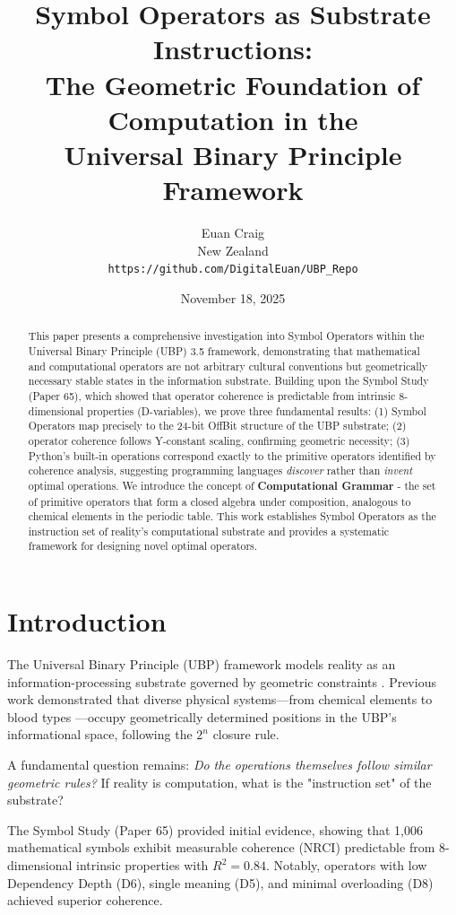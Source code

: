 \documentclass[12pt,a4paper]{article}
\title{\textbf{Symbol Operators as Substrate Instructions:\\
The Geometric Foundation of Computation in the\\
Universal Binary Principle Framework}}
\author{Euan Craig\\
New Zealand\\
\texttt{https://github.com/DigitalEuan/UBP\_Repo}}
\date{November 18, 2025}
\begin{document}
\maketitle

\begin{abstract}
This paper presents a comprehensive investigation into Symbol Operators within the Universal Binary Principle (UBP) 3.5 framework, demonstrating that mathematical and computational operators are not arbitrary cultural conventions but geometrically necessary stable states in the information substrate. Building upon the Symbol Study (Paper 65), which showed that operator coherence is predictable from intrinsic 8-dimensional properties (D-variables), we prove three fundamental results: (1) Symbol Operators map precisely to the 24-bit OffBit structure of the UBP substrate; (2) operator coherence follows Y-constant scaling, confirming geometric necessity; (3) Python's built-in operations correspond exactly to the primitive operators identified by coherence analysis, suggesting programming languages \emph{discover} rather than \emph{invent} optimal operations. We introduce the concept of \textbf{Computational Grammar} - the set of primitive operators that form a closed algebra under composition, analogous to chemical elements in the periodic table. This work establishes Symbol Operators as the instruction set of reality's computational substrate and provides a systematic framework for designing novel optimal operators.
\end{abstract}

\section{Introduction}

The Universal Binary Principle (UBP) framework models reality as an information-processing substrate governed by geometric constraints \cite{UBP_3.5_Manual}. Previous work demonstrated that diverse physical systems—from chemical elements \cite{Periodic_Table_Study} to blood types \cite{Grammar_Reality}—occupy geometrically determined positions in the UBP's informational space, following the $2^n$ closure rule.

A fundamental question remains: \emph{Do the operations themselves follow similar geometric rules?} If reality is computation, what is the "instruction set" of the substrate?

The Symbol Study (Paper 65) \cite{Symbol_Study} provided initial evidence, showing that 1,006 mathematical symbols exhibit measurable coherence (NRCI) predictable from 8-dimensional intrinsic properties with $R^2=0.84$. Notably, operators with low Dependency Depth (D6), single meaning (D5), and minimal overloading (D8) achieved superior coherence.
\end{document}
